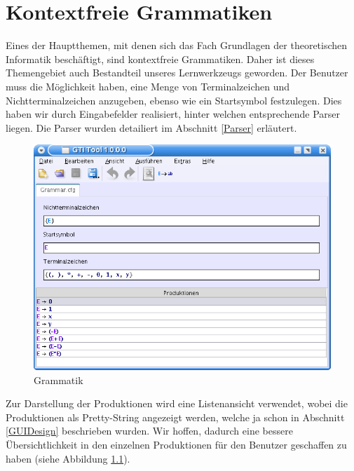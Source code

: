 



\chapter{Kontextfreie Grammatiken}\label{Grammars}

Eines der Hauptthemen, mit denen sich das Fach Grundlagen der theoretischen
Informatik beschäftigt, sind kontextfreie Grammatiken. Daher ist dieses Themengebiet auch
Bestandteil unseres Lernwerkzeugs geworden. Der Benutzer muss die Möglichkeit
haben, eine Menge von Terminalzeichen und Nichtterminalzeichen anzugeben, ebenso
wie ein Startsymbol festzulegen. Dies haben wir durch Eingabefelder realisiert,
hinter welchen entsprechende Parser liegen. Die Parser wurden detailiert im
Abschnitt
\ref{Parser} erläutert.\vspace{10pt}

\begin{figure}[h!]
\begin{center}
\includegraphics[width=12cm]{../images/cfg_example.png}
\caption{Grammatik}
\label{FigureProduction}
\end{center}
\end{figure}
\vspace{10pt}

Zur Darstellung der Produktionen wird eine Listenansicht verwendet, wobei die
Produktionen als Pretty-String angezeigt werden, welche ja schon in Abschnitt
\ref{GUIDesign} beschrieben wurden. Wir hoffen, dadurch eine bessere
Übersichtlichkeit in den einzelnen Produktionen für den Benutzer geschaffen zu haben (siehe Abbildung
\ref{FigureProduction}).\vspace{10pt}

